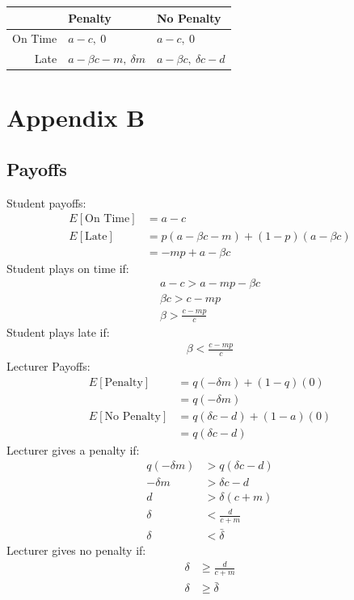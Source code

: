 \documentclass[11pt,preprint, authoryear]{elsarticle}
\let\origtable\table
\let\endorigtable\endtable
\renewenvironment{table}[1][2] {
    \expandafter\origtable\expandafter[H]
} {
    \endorigtable
}
\numberwithin{equation}{section}
\numberwithin{figure}{section}
\numberwithin{table}{section}
\begin{document}
\begin{table}[H]
\centering
\begin{tabular}{rll}
  \toprule
 & Penalty & No Penalty \\ 
  \midrule
On Time & $a-c, \ 0$ & $a-c, \ 0$ \\ 
  Late & $a-\beta c - m, \ \delta m$ & $a-\beta c, \ \delta c -d$ \\ 
   \bottomrule
\end{tabular}
\caption{Strategic form of the game \label{tab1}} 
\end{table}

\hypertarget{appendix-b}{%
\section*{\texorpdfstring{Appendix B
\label{B}}{Appendix B }}\label{appendix-b}}

\hypertarget{payoffs}{%
\subsection*{\texorpdfstring{Payoffs
\label{payoff}}{Payoffs }}\label{payoffs}}

Student payoffs: \begin{align*}
E[\text{On Time}]&= a- c \\
E[\text{Late}]&=  p(a-\beta c-m) +(1-p)(a-\beta c) \\
&=-m p+a-\beta c
\end{align*} Student plays on time if: \begin{align*}
a-c>a-m p-\beta c \\
\beta c>c-m p \\
\beta>\frac{c-m p}{c}
\end{align*} Student plays late if: \begin{align*}
\beta<\frac{c-m p}{c}
\end{align*} Lecturer Payoffs: \begin{align*}
E[\text{Penalty}]&=q(-\delta m)+(1-q)(0) \\
&=q(-\delta m) \\
E[\text{No Penalty}] &=q(\delta c-d)+(1-a)(0) \\
&=q(\delta c-d)
\end{align*} Lecturer gives a penalty if: \begin{align*}
q(-\delta m)&>q(\delta c-d) \\
-\delta m&>\delta c-d \\
d&>\delta(c+m) \\
\delta&<\frac{d}{c+m} \\
\delta &<\bar{\delta}
\end{align*} Lecturer gives no penalty if: \begin{align*}
\delta &\geq \frac{d}{c+m} \\
\delta &\geq \bar{\delta} \\
\end{align*}
\end{document}
